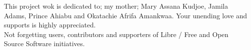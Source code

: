 
\begin{dedication} %
\centering
This project wok is dedicated to; my mother; Mary Assana Kudjoe, Jamila Adams, Prince Ahiabu and Okatachie Afrifa Amankwaa. Your unending love and supports is highly appreciated.\\

Not forgetting users, contributors and supporters of Libre / Free and Open Source Software initiatives.

\end{dedication}

